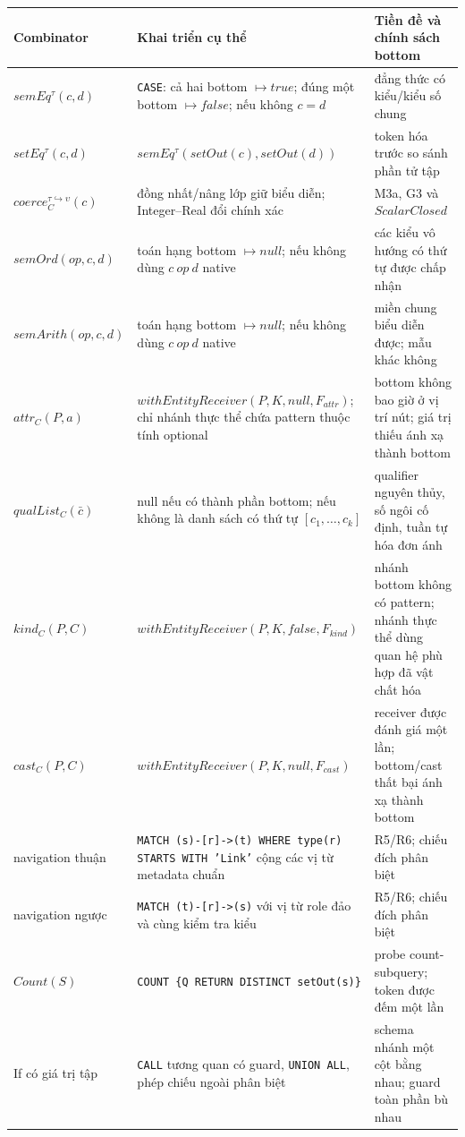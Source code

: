 \documentclass[11pt,a4paper]{article}
\theoremstyle{definition}
\begin{document}
\begingroup\scriptsize
\begin{longtable}{p{}p{}p{}}
\toprule Combinator & Khai triển cụ thể & Tiền đề và chính sách bottom\\ \midrule
$semEq^\tau(c,d)$ & \texttt{CASE}: cả hai bottom $\mapsto true$; đúng một bottom $\mapsto false$; nếu không $c=d$ & đẳng thức có kiểu/kiểu số chung\\
$setEq^\tau(c,d)$ & $semEq^\tau(setOut(c),setOut(d))$ & token hóa trước so sánh phần tử tập\\
$coerce_C^{\tau\hookrightarrow\upsilon}(c)$ & đồng nhất/nâng lớp giữ biểu diễn; Integer--Real đổi chính xác & M3a, G3 và $ScalarClosed$\\
$semOrd(op,c,d)$ & toán hạng bottom $\mapsto null$; nếu không dùng $c\ op\ d$ native & các kiểu vô hướng có thứ tự được chấp nhận\\
$semArith(op,c,d)$ & toán hạng bottom $\mapsto null$; nếu không dùng $c\ op\ d$ native & miền chung biểu diễn được; mẫu khác không\\
$attr_C(P,a)$ & $withEntityReceiver(P,K,null,F_{attr})$; chỉ nhánh thực thể chứa pattern thuộc tính optional & bottom không bao giờ ở vị trí nút; giá trị thiếu ánh xạ thành bottom\\
$qualList_C(\bar c)$ & null nếu có thành phần bottom; nếu không là danh sách có thứ tự $[c_1,\ldots,c_k]$ & qualifier nguyên thủy, số ngôi cố định, tuần tự hóa đơn ánh\\
$kind_C(P,C)$ & $withEntityReceiver(P,K,false,F_{kind})$ & nhánh bottom không có pattern; nhánh thực thể dùng quan hệ phù hợp đã vật chất hóa\\
$cast_C(P,C)$ & $withEntityReceiver(P,K,null,F_{cast})$ & receiver được đánh giá một lần; bottom/cast thất bại ánh xạ thành bottom\\
navigation thuận & \texttt{MATCH (s)-[r]->(t) WHERE type(r) STARTS WITH 'Link'} cộng các vị từ metadata chuẩn & R5/R6; chiếu đích phân biệt\\
navigation ngược & \texttt{MATCH (t)-[r]->(s)} với vị từ role đảo và cùng kiểm tra kiểu & R5/R6; chiếu đích phân biệt\\
$Count(S)$ & \texttt{COUNT \{Q RETURN DISTINCT setOut(s)\}} & probe count-subquery; token được đếm một lần\\
If có giá trị tập & \texttt{CALL} tương quan có guard, \texttt{UNION ALL}, phép chiếu ngoài phân biệt & schema nhánh một cột bằng nhau; guard toàn phần bù nhau\\
\bottomrule
\end{longtable}
\endgroup
\end{document}
